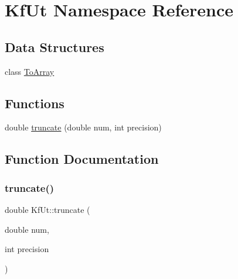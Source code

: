 \hypertarget{namespaceKfUt}{}\section{Kf\+Ut Namespace Reference}
\label{namespaceKfUt}
\subsection*{Data Structures}
\begin{DoxyCompactItemize}
\item 
class \mbox{\hyperlink{classKfUt_1_1ToArray}{To\+Array}}
\end{DoxyCompactItemize}
\subsection*{Functions}
\begin{DoxyCompactItemize}
\item 
double \mbox{\hyperlink{namespaceKfUt_a155e8db38d770e216ef19d9938394c17}{truncate}} (double num, int precision)
\end{DoxyCompactItemize}


\subsection{Function Documentation}
\mbox{\label{namespaceKfUt_a155e8db38d770e216ef19d9938394c17}} 
\subsubsection{\texorpdfstring{truncate()}{truncate()}}
{\footnotesize\ttfamily double Kf\+Ut\+::truncate (\begin{DoxyParamCaption}\item[{double}]{num,  }\item[{int}]{precision }\end{DoxyParamCaption})}


